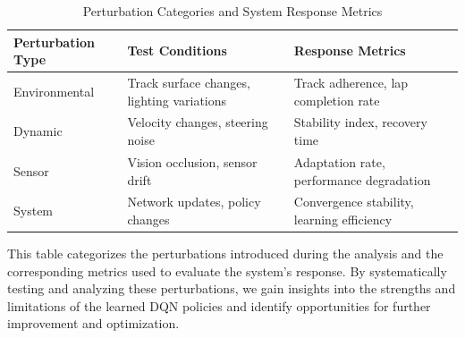 \begin{table}[h!]
\caption{Perturbation Categories and System Response Metrics}
\label{tab:perturbation_analysis}
\centering
\footnotesize
\begin{tabular}{|p{2.5cm}|p{2.0cm}|p{2.8cm}|}
\hline
\textbf{Perturbation Type} & \textbf{Test Conditions} & \textbf{Response Metrics} \\
\hline
Environmental & Track surface changes, lighting variations & Track adherence, lap completion rate \\
\hline
Dynamic & Velocity changes, steering noise & Stability index, recovery time \\
\hline
Sensor & Vision occlusion, sensor drift & Adaptation rate, performance degradation \\
\hline
System & Network updates, policy changes & Convergence stability, learning efficiency \\
\hline
\end{tabular}
\end{table}

This table categorizes the perturbations introduced during the analysis and the corresponding metrics used to evaluate the system's response. By systematically testing and analyzing these perturbations, we gain insights into the strengths and limitations of the learned DQN policies and identify opportunities for further improvement and optimization.

